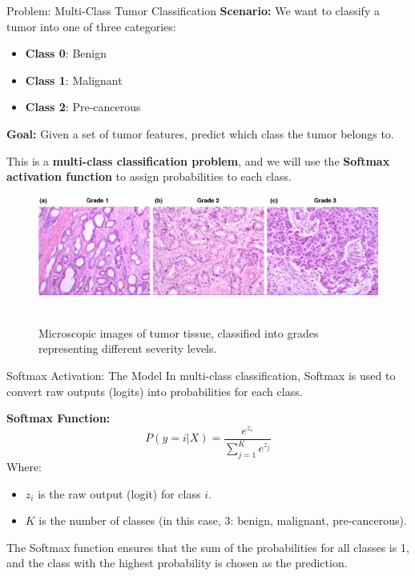 \documentclass[serif, aspectratio=169]{beamer}
\begin{document}
\begin{frame}{Problem: Multi-Class Tumor Classification}
    \textbf{Scenario:} We want to classify a tumor into one of three categories:
    \begin{itemize}
        \item \textbf{Class 0}: Benign
        \item \textbf{Class 1}: Malignant
        \item \textbf{Class 2}: Pre-cancerous
    \end{itemize}
    
    \textbf{Goal:} Given a set of tumor features, predict which class the tumor belongs to.
    
    This is a \textbf{multi-class classification problem}, and we will use the \textbf{Softmax activation function} to assign probabilities to each class.
    
            \begin{figure}
\centerline{\includegraphics[scale=.3]{pic/cancer.jpg}}
\\
{Microscopic images of tumor tissue, classified into grades representing different severity levels.}

\label{fig}
\end{figure}
\end{frame}
\begin{frame}{Softmax Activation: The Model}
    In multi-class classification, Softmax is used to convert raw outputs (logits) into probabilities for each class.
    
    \textbf{Softmax Function:}
    \[
    P(y = i | X) = \frac{e^{z_i}}{\sum_{j=1}^{K} e^{z_j}}
    \]
    Where:
    \begin{itemize}
        \item \( z_i \) is the raw output (logit) for class \( i \).
        \item \( K \) is the number of classes (in this case, 3: benign, malignant, pre-cancerous).
    \end{itemize}
    
    The Softmax function ensures that the sum of the probabilities for all classes is 1, and the class with the highest probability is chosen as the prediction.
\end{frame}
\end{document}
